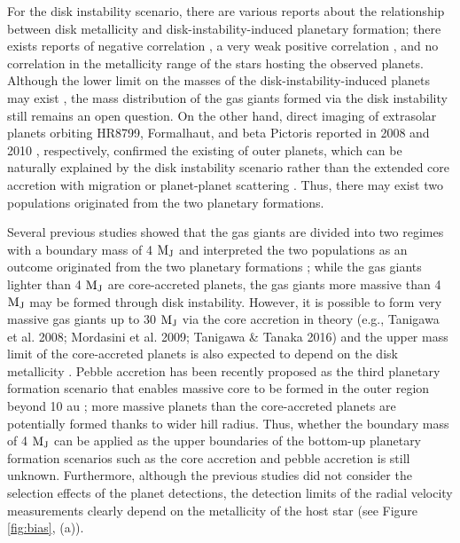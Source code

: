 \documentclass[twocolumn, dvipdfmx]{aastex62}
\begin{document}
\begin{CJK*}{UTF8}{min}
For the disk instability scenario, there are various reports about the relationship between disk metallicity and disk-instability-induced planetary formation; there exists reports of negative correlation \citep{2006ApJ...636L.149C, 2007Arizona}, a very weak positive correlation \citep{2007ApJ...661L..77M}, and no correlation \citep{2002ApJ...567L.149B} in the metallicity range of the stars hosting the observed planets. Although the lower limit on the masses of the disk-instability-induced planets may exist \citep{2007ApJ...662.1282M}, the mass distribution of the gas giants formed via the disk instability still remains an open question. On the other hand, direct imaging of extrasolar planets orbiting HR8799, Formalhaut, and beta Pictoris reported in 2008 and 2010 \citep{2008Sci...322.1348M, 2008Sci...322.1345K, 2010Sci...329...57L}, respectively, confirmed the existing of outer planets, which can be naturally explained by the disk instability scenario rather than the extended core accretion with migration or planet-planet scattering \citep{2009ApJ...707...79D}. Thus, there may exist two populations originated from the two planetary formations.

Several previous studies showed that the gas giants are divided into two regimes with a boundary mass of 4 $\rm M_J$ and interpreted the two populations as an outcome originated from the two planetary formations \citep{2007A&A...464..779R, 2017A&A...603A..30S, 2018ApJ...853...37S}; while the gas giants lighter than 4 $\rm M_J$ are core-accreted planets, the gas giants more massive than 4 $\rm M_J$ may be formed through disk instability. However, it is possible to form very massive gas giants up to 30 $\rm M_J$ via the core accretion in theory \citep[e.g.,][]{2016ApJ...823...48T}(e.g., Tanigawa et al. 2008; Mordasini et al. 2009; Tanigawa \& Tanaka 2016) and the upper mass limit of the core-accreted planets is also expected to depend on the disk metallicity \citep{2012A&A...541A..97M}. Pebble accretion has been recently proposed as the third planetary formation scenario that enables massive core to be formed in the outer region beyond 10 au \citep{2010A&A...520A..43O, 2012A&A...544A..32L}; more massive planets than the core-accreted planets are potentially formed thanks to wider hill radius. Thus, whether the boundary mass of 4 $\rm M_J$ can be applied as the upper boundaries of the bottom-up planetary formation scenarios such as the core accretion and pebble accretion is still unknown. Furthermore, although the previous studies did not consider the selection effects of the planet detections, the detection limits of the radial velocity measurements clearly depend on the metallicity of the host star (see Figure \ref{fig:bias}, (a)). 


\end{CJK*}
\end{document}
